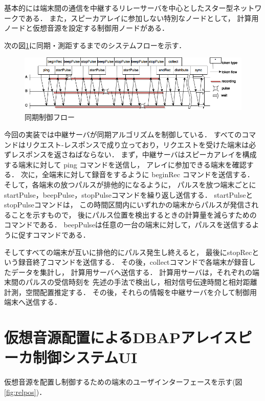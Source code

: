 基本的には端末間の通信を中継するリレーサーバを中心としたスター型ネットワークである．
また，スピーカアレイに参加しない特別なノードとして，
計算用ノードと仮想音源を設定する制御用ノードがある．

次の図\ref{fig:flowchart}に同期・測距するまでのシステムフローを示す．

\begin{figure}[tb]\centering
  \hspace{-2mm}\includegraphics[clip,width=1.1\hsize]{img/flowchart.png}
  \caption{同期制御フロー}\label{fig:flowchart}
\end{figure}

今回の実装では中継サーバが同期アルゴリズムを制御している．
すべてのコマンドはリクエスト-レスポンスで成り立っており，リクエストを受けた端末は必ずレスポンスを返さねばならない．
まず，中継サーバはスピーカアレイを構成する端末に対して ping コマンドを送信し，
アレイに参加できる端末を確認する．
次に，全端末に対して録音をするように beginRec コマンドを送信する．
そして，各端末の放つパルスが排他的になるように，
パルスを放つ端末ごとにstartPulse，beepPulse，stopPulseコマンドを繰り返し送信する．
startPulseとstopPulseコマンドは，
この時間区間内にいずれかの端末からパルスが発信されることを示すもので，
後にパルス位置を検出するときの計算量を減らすためのコマンドである．
beepPulseは任意の一台の端末に対して，パルスを送信するように促すコマンドである．

そしてすべての端末が互いに排他的にパルス発生し終えると，
最後にstopRecという録音終了コマンドを送信する．
その後，collectコマンドで各端末が録音したデータを集計し，
計算用サーバへ送信する．
計算用サーバは，それぞれの端末間のパルスの受信時刻を
先述の手法で検出し，相対信号伝達時間と相対距離計測，空間配置推定する．
その後，それらの情報を中継サーバを介して制御用端末へ送信する．

\section{仮想音源配置によるDBAPアレイスピーカ制御システムUI}

仮想音源を配置し制御するための端末のユーザインターフェースを示す(図\ref{fig:relpos})．

